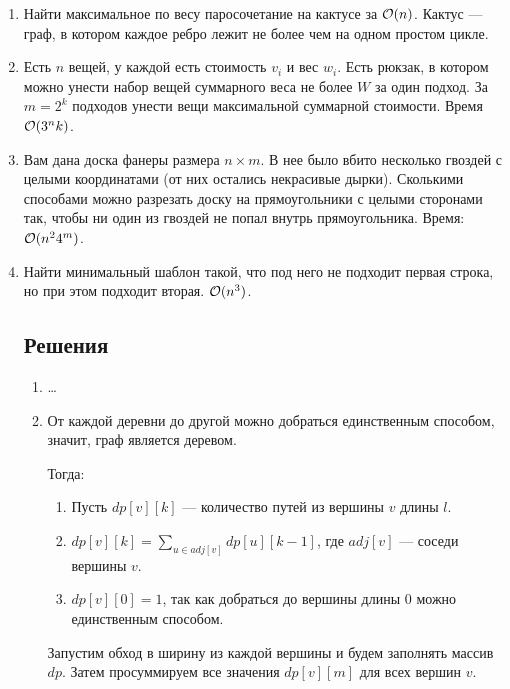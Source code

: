 \begin{enumerate}
  \item
	Найти максимальное по весу паросочетание на кактусе за
	$\mathcal{O}(n)$. Кактус --- граф, в котором каждое ребро лежит не более чем
	на одном простом цикле.

  \item
	Есть $n$ вещей, у каждой есть стоимость $v_i$ и вес $w_i$. Есть рюкзак, в
	котором можно унести набор вещей суммарного веса не более $W$
	за один подход. За $m = 2^k$ подходов унести вещи максимальной суммарной стоимости.
	Время $\mathcal{O}(3^nk)$.

  \item
	Вам дана доска фанеры размера $n \times m$. В нее было вбито
    несколько гвоздей с целыми координатами (от них остались некрасивые
	дырки). Сколькими способами можно разрезать доску на прямоугольники
	с целыми сторонами так, чтобы ни один из гвоздей не попал внутрь
	прямоугольника. Время: $\mathcal{O}(n^2 4^m)$.

  \item
 	Найти минимальный шаблон такой, что под него не подходит первая строка,
 	но при этом подходит вторая. $\mathcal{O}(n^3)$.

\newpage

\subsection{Решения}

\begin{enumerate}

    \item \dots

    \item
    
    От каждой деревни до другой можно добраться единственным способом, значит, граф является деревом.
    
    Тогда:
    
    \begin{enumerate}
    
    \item Пусть $dp[v][k]$ --- количество путей из вершины $v$ длины $l$.
    \item $dp[v][k] = \sum\limits_{u \in adj[v]} dp[u][k - 1]$, где $adj[v]$ --- соседи вершины $v$.
    \item $dp[v][0] = 1$, так как добраться до вершины длины $0$ можно единственным способом.
    
    \end{enumerate}
    
    Запустим обход в ширину из каждой вершины и будем заполнять массив $dp$. 
    Затем просуммируем все значения $dp[v][m]$ для всех вершин $v$.
    

\end{enumerate}
\end{enumerate}
